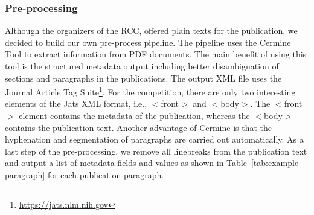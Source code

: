 


\subsubsection{Pre-processing}
\label{sec:prepro}
Although the organizers of the RCC, offered plain texts for the publication, we decided to build our own pre-process pipeline. The pipeline uses the Cermine Tool to extract information from PDF documents. The main benefit of using this tool is the structured metadata output including better disambiguation of sections and paragraphs in the publications. The output XML file uses the Journal Article Tag Suite\footnote{\url{https://jats.nlm.nih.gov}}. For the competition, there are only two interesting elements of the Jats XML format, i.e., $<$front$>$ and $<$body$>$. The $<$front$>$ element contains the metadata of the publication, whereas the $<$body$>$ contains the publication text. Another advantage of Cermine is that the hyphenation and segmentation of paragraphs are carried out automatically. 
As a last step of the pre-processing, we remove all linebreaks from the publication text and output a list of metadata fields and values as shown in Table~\ref{tab:example-paragraph} for each publication paragraph.

